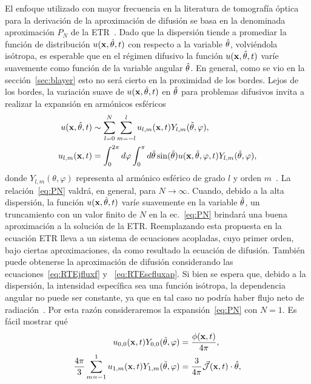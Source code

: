 El enfoque utilizado con mayor frecuencia en la literatura de tomografía óptica para la derivación de la aproximación de difusión se basa 
en la denominada aproximación $P_N$ de la ETR~\cite{Arridge2009}. Dado que la dispersión tiende a promediar la función de distribución $u(\mathbf{x},\hat{\theta},t)$ con respecto a la variable $\hat{\theta}$, volviéndola isótropa, es esperable que en el régimen difusivo la función $u(\mathbf{x},\hat{\theta},t)$ varíe suavemente como función de la variable angular $\hat{\theta}$. En general, como se vio en la sección~\ref{sec:blayer} esto no será cierto en la proximidad de los bordes. Lejos de los bordes, la variación suave de $u(\mathbf{x},\hat{\theta},t)$ en $\hat{\theta}$ para problemas difusivos invita a realizar la expansión en armónicos esféricos
\begin{equation}
\begin{split}
\begin{aligned}
u(\mathbf{x},\hat{\theta},t)&\sim \sum_{l=0}^{N}\sum_{m=-l}^lu_{l,m}(\mathbf{x},t)Y_{l,m}(\tilde{\theta},\varphi), \\ 
u_{l,m}(\mathbf{x},t)&=\int_{0}^{2\pi} d\varphi \int_0^{\pi} d\tilde{\theta} \sin (\tilde{\theta})  u(\mathbf{x},\tilde{\theta},\varphi,t) Y_{l,m}(\tilde{\theta},\varphi) ,
\end{aligned}
\end{split}
\label{eq:PN}
\end{equation}
donde $Y_{l,m}(\theta,\varphi)$ representa al armónico esférico de grado $l$ y orden $m$~\cite{Sansone1991}. La relación~\eqref{eq:PN} valdrá, en general, para $N \rightarrow \infty$. Cuando, debido a la alta dispersión, la función $u(\mathbf{x},\hat{\theta},t)$ 
varíe suavemente en la variable $\hat{\theta}$, un truncamiento con un valor 
finito de $N$ en la ec.~\eqref{eq:PN} brindará una buena aproximación 
a la solución de la ETR.
Reemplazando esta propuesta en la ecuación ETR lleva a un sistema de ecuaciones acopladas, cuyo primer orden, bajo ciertas aproximaciones, da como resultado la ecuación de difusión. También puede obtenerse la aproximación de difusión considerando las ecuaciones~\eqref{eq:RTEjfluxf} y ~\eqref{eq:RTEscfluxap}. Si bien se espera que, debido a la dispersión, la intensidad específica sea una función isótropa, la dependencia angular no puede ser constante, ya que en tal caso 
no podría haber flujo neto de radiación~\cite[cap. 9, p. 176]{Ishimaru1978}. Por esta razón consideraremos la expansión~\eqref{eq:PN} con $N=1$. 
Es fácil mostrar qué
\begin{equation}
\begin{split}
\begin{aligned}
u_{0,0}(\mathbf{x},t) Y_{0,0}(\tilde{\theta},\varphi) &=\frac{\phi(\mathbf{x},t)}{4\pi},\\
\frac{4\pi}{3} \sum_{m=-1}^1 u_{1,m}(\mathbf{x},t)Y_{1,m} (\tilde{\theta},\varphi) & = \frac{3}{4\pi} \vec{ \mathcal{J}}(\mathbf{x},t) \cdot \hat{\theta},
\end{aligned}
\end{split}
\label{eq:PN2}
\end{equation}
